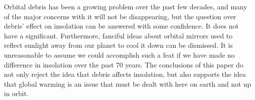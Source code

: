 \documentclass[11pt]{article}
\begin{document}
\begin{multicols*}{2}
Orbital debris has been a growing problem over the past few decades, and many of the major concerns with it will not be disappearing, but the question over debris' effect on insolation can be answered with some confidence. It does not have a significant. Furthermore, fanciful ideas about orbital mirrors used to reflect sunlight away from our planet to cool it down can be dismissed. It is unreasonable to assume we could accomplish such a feat if we have made no difference in insolation over the past 70 years. The conclusions of this paper do not only reject the idea that debris affects insolation, but also supports the idea that global warming is an issue that must be dealt with here on earth and not up in orbit.


{}


\end{multicols*}
\end{document}
